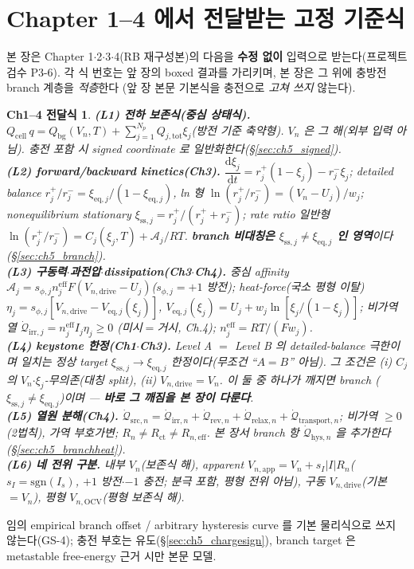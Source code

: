 \documentclass[11pt,a4paper]{article}
\newtheorem*{linkbox}{Ch1--4 전달식}
\newcommand{\dd}{\mathrm{d}}
\newcommand{\eff}{\mathrm{eff}}
\newcommand{\eq}{\mathrm{eq}}
\newcommand{\app}{\mathrm{app}}
\newcommand{\drive}{\mathrm{drive}}
\newcommand{\bg}{\mathrm{bg}}
\newcommand{\cell}{\mathrm{cell}}
\newcommand{\OCV}{\mathrm{OCV}}
\newcommand{\tot}{\mathrm{tot}}
\newcommand{\irr}{\mathrm{irr}}
\newcommand{\rev}{\mathrm{rev}}
\newcommand{\src}{\mathrm{src}}
\newcommand{\rlx}{\mathrm{relax}}
\newcommand{\ct}{\mathrm{ct}}
\newcommand{\transp}{\mathrm{transport}}
\newcommand{\hys}{\mathrm{hys}}
\newcommand{\sstat}{\mathrm{ss}}
\begin{document}
\section{Chapter 1--4 에서 전달받는 고정 기준식}\label{sec:ch5_inherit}
본 장은 Chapter 1$\cdot$2$\cdot$3$\cdot$4(RB 재구성본)의 다음을 \textbf{수정 없이} 입력으로 받는다(프로젝트
검수 P3-6). 각 식 번호는 앞 장의 boxed 결과를 가리키며, 본 장은 그 위에 충방전 branch 계층을 \emph{적층}한다
(앞 장 본문 기본식을 충전으로 \emph{고쳐 쓰지} 않는다).
\begin{linkbox}
\textbf{(L1) 전하 보존식(중심 상태식).} $Q_\cell\,q=Q_\bg(V_n,T)+\sum_{j=1}^{N_p}Q_{j,\tot}\xi_j$(방전 기준
축약형). $V_n$ 은 그 해(외부 입력 아님). 충전 포함 시 signed coordinate 로 일반화한다(\S\ref{sec:ch5_signed}).\\
\textbf{(L2) forward/backward kinetics(Ch3).} $\dfrac{\dd\xi_j}{\dd t}=r_j^+(1-\xi_j)-r_j^-\xi_j$; detailed
balance $r_j^+/r_j^-=\xi_{\eq,j}/(1-\xi_{\eq,j})$, ln 형 $\ln(r_j^+/r_j^-)=(V_n-U_j)/w_j$; nonequilibrium
stationary $\xi_{\sstat,j}=r_j^+/(r_j^++r_j^-)$; rate ratio 일반형 $\ln(r_j^+/r_j^-)=C_j(\xi_j,T)+\mathcal A_j/RT$.
\textbf{branch 비대칭은 $\xi_{\sstat,j}\ne\xi_{\eq,j}$ 인 영역}이다(\S\ref{sec:ch5_branch}).\\
\textbf{(L3) 구동력$\cdot$과전압$\cdot$dissipation(Ch3$\cdot$Ch4).} 중심 affinity $\mathcal A_j=s_{\phi,j}n_j^{\eff}
F(V_{n,\drive}-U_j)$($s_{\phi,j}=+1$ 방전); heat-force(국소 평형 이탈) $\eta_j=s_{\phi,j}[V_{n,\drive}-V_{\eq,j}(\xi_j)]$,
$V_{\eq,j}(\xi_j)=U_j+w_j\ln[\xi_j/(1-\xi_j)]$; 비가역 열 $\dot{\mathcal Q}_{\irr,j}=n_j^{\eff}I_j\eta_j\ge0$
(미시$=$거시, Ch.4); $n_j^{\eff}=RT/(Fw_j)$.\\
\textbf{(L4) keystone 한정(Ch1$\cdot$Ch3).} Level A $=$ Level B 의 detailed-balance \emph{극한}이며 일치는
\emph{정상 target} $\xi_{\sstat,j}\to\xi_{\eq,j}$ \emph{한정}이다(무조건 ``$A=B$'' 아님). 그 조건은 (i) $C_j$
의 $V_n$$\cdot$$\xi_j$-무의존(대칭 split), (ii) $V_{n,\drive}=V_n$. \emph{이 둘 중 하나가 깨지면 branch}
($\xi_{\sstat,j}\ne\xi_{\eq,j}$)이며 — \textbf{바로 그 깨짐을 본 장이 다룬다}.\\
\textbf{(L5) 열원 분해(Ch4).} $\dot{\mathcal Q}_{\src,n}=\dot{\mathcal Q}_{\irr,n}+\dot{\mathcal Q}_{\rev,n}
+\dot{\mathcal Q}_{\rlx,n}+\dot{\mathcal Q}_{\transp,n}$; 비가역 $\ge0$(2법칙), 가역 부호가변; $R_n\ne R_\ct\ne R_{n,\eff}$.
본 장서 branch 항 $\dot{\mathcal Q}_{\hys,n}$ 을 추가한다(\S\ref{sec:ch5_branchheat}).\\
\textbf{(L6) 네 전위 구분.} 내부 $V_n$(보존식 해), apparent $V_{n,\app}=V_n+s_I|I|R_n$($s_I=\mathrm{sgn}(I_s)$,
$+1$ 방전$\cdot$$-1$ 충전; 분극 포함, 평형 전위 아님), 구동 $V_{n,\drive}$(기본 $=V_n$), 평형
$V_{n,\OCV}$(평형 보존식 해).
\end{linkbox}
임의 empirical branch offset / arbitrary hysteresis curve 를 기본 물리식으로 쓰지 않는다(GS-4); 충전 부호는
유도(\S\ref{sec:ch5_chargesign}), branch target 은 metastable free-energy 근거 시만 본문 모델.
\end{document}
